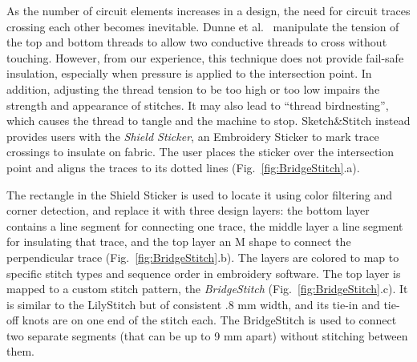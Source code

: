 \documentclass{sigchi}
\begin{document}
As the number of circuit elements increases in a design, the need for circuit traces crossing each other becomes inevitable. Dunne et al.\ \cite{Dunne:2012:MEC:2370216.2370348} manipulate the tension of the top and bottom threads to allow two conductive threads to cross without touching. However, from our experience, this technique does not provide fail-safe insulation, especially when pressure is applied to the intersection point. In addition, adjusting the thread tension to be too high or too low impairs the strength and appearance of stitches. It may also lead to ``thread birdnesting'', which causes the thread to tangle and the machine to stop.  
Sketch\&Stitch instead provides users with the \textit{Shield Sticker}, an Embroidery Sticker to mark trace crossings to insulate on fabric. The user places the sticker over the intersection point and aligns the traces to its dotted lines (Fig.\ \ref{fig:BridgeStitch}.a). 


The rectangle in the Shield Sticker is used to locate it using color filtering and corner detection, and replace it with three design layers: the bottom layer contains a line segment for connecting one trace, the middle layer a line segment for insulating that trace, and the top layer an M shape to connect the perpendicular trace (Fig.\ \ref{fig:BridgeStitch}.b). The layers are colored to map to specific stitch types and sequence order in embroidery software. The top layer is mapped to a custom stitch pattern, the \textit{BridgeStitch} (Fig.\ \ref{fig:BridgeStitch}.c). It is similar to the LilyStitch but of consistent .8 mm width, and its tie-in and tie-off knots are on one end of the stitch each. The BridgeStitch is used to connect two separate segments (that can be up to 9 mm apart) without stitching between them.


\end{document}
